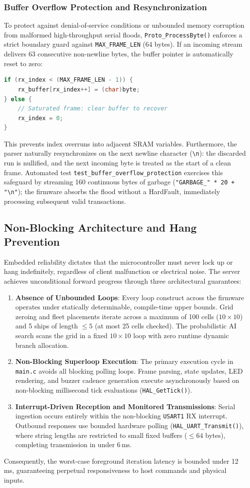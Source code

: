 \subsubsection{Buffer Overflow Protection and Resynchronization}
To protect against denial-of-service conditions or unbounded memory corruption from malformed high-throughput serial floods, \texttt{Proto\_ProcessByte()} enforces a strict boundary guard against \texttt{MAX\_FRAME\_LEN} (64 bytes). If an incoming stream delivers 63 consecutive non-newline bytes, the buffer pointer is automatically reset to zero:
\begin{lstlisting}[language=C]
if (rx_index < (MAX_FRAME_LEN - 1)) {
    rx_buffer[rx_index++] = (char)byte;
} else {
    // Saturated frame: clear buffer to recover
    rx_index = 0;
}
\end{lstlisting}
This prevents index overruns into adjacent SRAM variables. Furthermore, the parser naturally resynchronizes on the next newline character (\texttt{\textbackslash n}): the discarded run is nullified, and the next incoming byte is treated as the start of a clean frame. Automated test \texttt{test\_buffer\_overflow\_protection} exercises this safeguard by streaming 160 continuous bytes of garbage (\texttt{"GARBAGE\_" * 20 + "\textbackslash n"}); the firmware absorbs the flood without a HardFault, immediately processing subsequent valid transactions.

\subsection{Non-Blocking Architecture and Hang Prevention}
Embedded reliability dictates that the microcontroller must never lock up or hang indefinitely, regardless of client malfunction or electrical noise. The server achieves unconditional forward progress through three architectural guarantees:
\begin{enumerate}
    \item \textbf{Absence of Unbounded Loops}: Every loop construct across the firmware operates under statically determinable, compile-time upper bounds. Grid zeroing and fleet placements iterate across a maximum of 100 cells ($10 \times 10$) and 5 ships of length $\le 5$ (at most 25 cells checked). The probabilistic AI search scans the grid in a fixed $10 \times 10$ loop with zero runtime dynamic branch allocation.
    \item \textbf{Non-Blocking Superloop Execution}: The primary execution cycle in \texttt{main.c} avoids all blocking polling loops. Frame parsing, state updates, LED rendering, and buzzer cadence generation execute asynchronously based on non-blocking millisecond tick evaluations (\texttt{HAL\_GetTick()}).
    \item \textbf{Interrupt-Driven Reception and Monitored Transmissions}: Serial ingestion occurs entirely within the non-blocking \texttt{USART1} RX interrupt. Outbound responses use bounded hardware polling (\texttt{HAL\_UART\_Transmit()}), where string lengths are restricted to small fixed buffers ($\le 64$ bytes), completing transmission in under 6\,ms.
\end{enumerate}
Consequently, the worst-case foreground iteration latency is bounded under 12\,ms, guaranteeing perpetual responsiveness to host commands and physical inputs.
